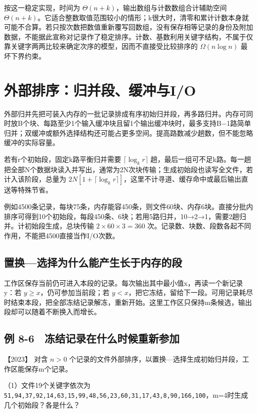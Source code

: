按这一稳定实现，时间为 \(\Theta(n+k)\)，输出数组与计数数组合计辅助空间 \(\Theta(n+k)\)。它适合整数取值范围较小的情形；k很大时，清零和累计计数本身就可能不合算。若只按次数把数值重新覆写回数组，没有保存相等记录的身份及附加数据，不能据此宣称对记录作了稳定排序。计数、基数利用关键字结构，不属于仅靠关键字两两比较来确定次序的模型，因而不直接受比较排序的 \(\Omega(n\log n)\) 最坏下界约束。

\section{外部排序：归并段、缓冲与I/O}\label{ds-08-10}

外部归并先把可装入内存的一批记录排成有序初始归并段，再多路归并。内存可同时放B个块、每路至少1个输入缓冲块且留1个输出缓冲块时，最多支持B−1路简单归并；双缓冲或额外选择结构还可能占更多空间。提高路数减少趟数，但不能忽略缓冲的实际容量。

若有r个初始段，固定k路平衡归并需要 \(\lceil\log_k r\rceil\) 趟，最后一组可不足k路。每一趟把全部N个数据块读入并写出，通常为2N次块传输；生成初始段也读写全文件，若计入该阶段，总量为 \(2N[1+\lceil\log_k r\rceil]\)，这里不计寻道、缓存命中或最后输出直送等特殊节省。

例如4500条记录，每块75条，内存能容450条，则文件60块、内存6块。直接分批内排序可得到10个初始段，每段450条、6块；若用5路归并，10→2→1，需要2趟归并。计初始段生成，总块传输 \(2\times60\times3=360\) 次。记录数、块数、段数各起不同作用，不能把4500直接当作I/O次数。

\subsection{置换---选择为什么能产生长于内存的段}\label{ds-c08-h189}

工作区保存当前仍可进入本段的记录。每次输出其中最小值x，再读一个新记录y：若 \(y\ge x\)，仍可参加当前段；若 \(y<x\)，把它冻结，留给下一段。可用记录耗尽时结束本段，把全部冻结记录解冻，重新开始。这里工作区只保持m条候选，输出段却可以随着不断换入而增长。

\subsection{例 8-6　冻结记录在什么时候重新参加}\label{ds-ex8-6}

\noindent{}【2023】 对含 \(n>0\) 个记录的文件外部排序，以置换---选择生成初始归并段，工作区能保存m个记录。

（1）文件19个关键字依次为 \texttt{51,}\allowbreak{}\texttt{94,}\allowbreak{}\texttt{37,}\allowbreak{}\texttt{92,}\allowbreak{}\texttt{14,}\allowbreak{}\texttt{63,}\allowbreak{}\texttt{15,}\allowbreak{}\texttt{99,}\allowbreak{}\texttt{48,}\allowbreak{}\texttt{56,}\allowbreak{}\texttt{23,}\allowbreak{}\texttt{60,}\allowbreak{}\texttt{31,}\allowbreak{}\texttt{17,}\allowbreak{}\texttt{43,}\allowbreak{}\texttt{8,}\allowbreak{}\texttt{90,}\allowbreak{}\texttt{166,}\allowbreak{}\texttt{100}，m=4时生成几个初始段？各是什么？

